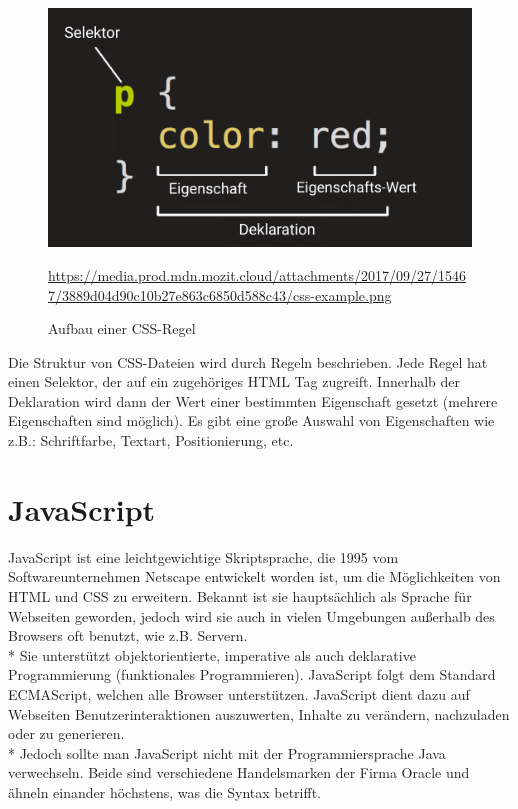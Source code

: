 \begin{figure}[htp]
    \centering
    \includegraphics[scale=0.3]{pics/CSSRegel.png}
    \caption{Aufbau einer CSS-Regel}
        \small \url{https://media.prod.mdn.mozit.cloud/attachments/2017/09/27/15467/3889d04d90c10b27e863c6850d588c43/css-example.png}
    \label{fig:impl:CSSRule}
\end{figure}

Die Struktur von CSS-Dateien wird durch Regeln beschrieben. Jede Regel hat einen Selektor, der auf ein zugehöriges HTML Tag zugreift.
Innerhalb der Deklaration wird dann der Wert einer bestimmten Eigenschaft gesetzt (mehrere Eigenschaften sind möglich).
Es gibt eine große Auswahl von Eigenschaften wie z.B.: Schriftfarbe, Textart, Positionierung, etc. \cite{CSSMozilla}

\section{JavaScript}
\author{Benjamin Besic}
JavaScript ist eine leichtgewichtige Skriptsprache, die 1995 vom Softwareunternehmen Netscape entwickelt worden ist, um die Möglichkeiten von HTML und CSS zu erweitern.
Bekannt ist sie hauptsächlich als Sprache für Webseiten geworden, jedoch wird sie auch in vielen Umgebungen außerhalb des Browsers oft benutzt, wie z.B. Servern. 
\\* Sie unterstützt objektorientierte, imperative als auch deklarative Programmierung (funktionales Programmieren). JavaScript folgt dem Standard ECMAScript, welchen alle Browser unterstützen. 
JavaScript dient dazu auf Webseiten Benutzerinteraktionen auszuwerten, Inhalte zu verändern, nachzuladen oder zu generieren.  \\*
Jedoch sollte man JavaScript nicht mit der Programmiersprache Java verwechseln. Beide sind verschiedene Handelsmarken der Firma Oracle und ähneln einander höchstens, was die Syntax betrifft.
\cite{JSWiki} \cite{JSMozilla}
